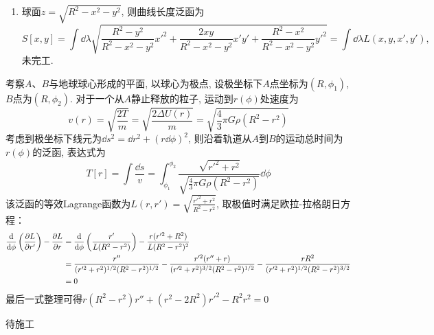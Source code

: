 \begin{solution}
\begin{enumerate}[label=(\arabic*)]
\begin{enumerate}[label=(\arabic{enumi}.\arabic*)]
            \item 球面\( z = \sqrt{R^2 - x^2 - y^2} \), 则曲线长度泛函为
            \[
                S[x,y] = \int \dd \lambda \sqrt{\frac{R^2 - y^2}{R^2 - x^2 - y^2} x'^2 + \frac{2xy}{R^2 - x^2 - y^2} x' y' + \frac{R^2 - x^2}{R^2 - x^2 - y^2} y'^2} = \int \dd \lambda L\left(x, y, x',y'\right),
            \]
            未完工.
        \end{enumerate}
    \end{enumerate}
\end{solution}

\begin{solution}
    考察\(A\)、\(B\)与地球球心形成的平面, 以球心为极点, 设极坐标下\(A\)点坐标为\( (R,\phi_1) \), \(B\)点为\( (R,\phi_2) \). 
    对于一个从\(A\)静止释放的粒子, 运动到\( r(\phi) \)处速度为
    \[
        v(r) = \sqrt{\frac{2T}{m}} = \sqrt{\frac{2\Delta U(r)}{m}} = \sqrt{\frac43 \pi G \rho (R^2-r^2)}
    \]
    考虑到极坐标下线元为\( \dd s^2 = \dd r^2 + (r\dd \phi)^2 \), 则沿着轨道从\(A\)到\(B\)的运动总时间为\( r(\phi) \)的泛函, 表达式为
    \[
        T[r] = \int \frac{\dd s}{v}
             = \int_{\phi_1}^{\phi_2} \frac{ \sqrt{r'^2+r^2} }{ \sqrt{\frac43 \pi G \rho (R^2-r^2)} }\dd \phi
    \]
    该泛函的等效Lagrange函数为\( L(r,r')= \sqrt{\frac{r'^2+r^2}{R^2-r^2}} \), 取极值时满足欧拉-拉格朗日方程：
    \[
    \begin{aligned}
        \frac{\dd}{\dd \phi} \left( \frac{\partial L}{\partial r'} \right) - \frac{\partial L}{\partial r}
        & = \frac{\dd}{\dd \phi} \left( \frac{r'}{L(R^2-r^2)} \right) - \frac{r(r'^2+R^2)}{L(R^2-r^2)^2} \\
        & = \frac{r''}{(r'^2+r^2)^{1/2}(R^2-r^2)^{1/2}} - 
            \frac{r'^2(r''+r)}{(r'^2+r^2)^{3/2}(R^2-r^2)^{1/2}} - 
            \frac{rR^2}{(r'^2+r^2)^{1/2}(R^2-r^2)^{3/2}} \\
        & = 0
    \end{aligned}
    \]
    最后一式整理可得\( r(R^2-r^2)r''+(r^2-2R^2)r'^2-R^2r^2 = 0 \)
\end{solution}

\begin{solution}
    待施工
\end{solution}

